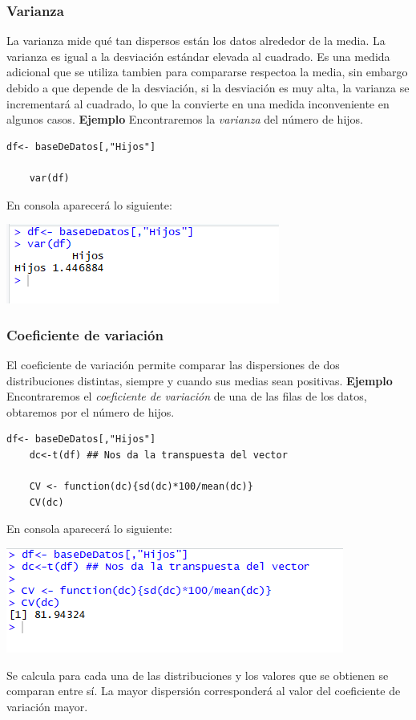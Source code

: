 \documentclass[12pt,hidelinks]{article}
\begin{document}
	\subsubsection{Varianza}
	La varianza mide qué tan dispersos están los datos alrededor de la media. La varianza es igual a la desviación estándar elevada al cuadrado. Es una medida adicional que se utiliza tambien para compararse respectoa la media, sin embargo debido a que depende de la desviación, si la desviación es muy alta, la varianza se incrementará al cuadrado, lo que la convierte en una medida inconveniente en algunos casos. \textbf{Ejemplo} Encontraremos la \textit{varianza} del número de hijos.
	\begin{lstlisting}[frame=single]
	df<- baseDeDatos[,"Hijos"]
	
	var(df)
	\end{lstlisting}
	En consola aparecerá lo siguiente:
	\begin{center}
		\includegraphics[]{Varianza.PNG}
	\end{center}
	\subsubsection{Coeficiente de variación}
	El coeficiente de variación permite comparar las dispersiones de dos distribuciones distintas, siempre y cuando sus medias sean positivas. \textbf{Ejemplo} Encontraremos el \textit{coeficiente de variación} de una de las filas de los datos, obtaremos por el número de hijos.
	\begin{lstlisting}[frame=single]
	df<- baseDeDatos[,"Hijos"]
	dc<-t(df) ## Nos da la transpuesta del vector
	
	CV <- function(dc){sd(dc)*100/mean(dc)}
	CV(dc)
	\end{lstlisting}
	En consola aparecerá lo siguiente:
	\begin{center}
		\includegraphics[]{Coeficiente_varianza.PNG}
	\end{center}
	Se calcula para cada una de las distribuciones y los valores que se obtienen se comparan entre sí. La mayor dispersión corresponderá al valor del coeficiente de variación mayor.
\end{document}

